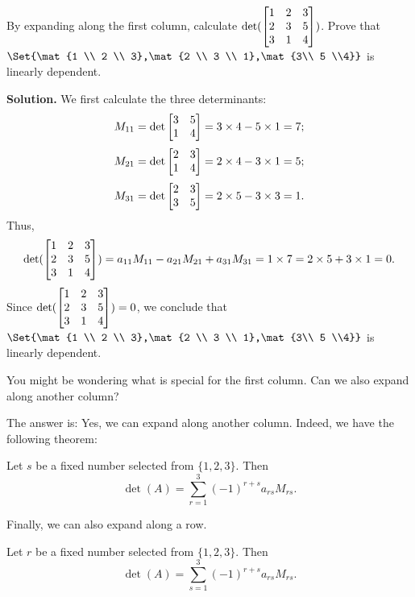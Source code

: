 \begin{example}
By expanding along the first column, calculate \(\det(\mat{1 & 2 & 3 \\ 2 & 3 & 5 \\ 3 & 1 & 4})\). Prove that \(\Set{\mat{1 \\ 2 \\ 3},\mat{2 \\ 3 \\ 1},\mat{3\\ 5 \\4}}\) is linearly dependent.
\end{example}
\textbf{Solution. }
We first calculate the three determinants:
\[M_{11}=\det\mat{3 & 5 \\ 1 & 4}=3\times 4 - 5\times 1=7;\]
\[M_{21}=\det\mat{2 & 3 \\ 1 & 4}=2\times 4 - 3\times 1=5;\]
\[M_{31}=\det\mat{2 & 3 \\ 3 & 5}=2\times 5 - 3\times 3=1.\]
Thus, \[\det(\mat{1 & 2 & 3 \\ 2 & 3 & 5 \\ 3 & 1 & 4})=a_{11}M_{11}-a_{21}M_{21}+a_{31}M_{31}=1\times 7=2\times 5+3\times 1=0.\]
Since \(\det(\mat{1 & 2 & 3 \\ 2 & 3 & 5 \\ 3 & 1 & 4})=0\), we conclude that \(\Set{\mat{1 \\ 2 \\ 3},\mat{2 \\ 3 \\ 1},\mat{3\\ 5 \\4}}\) is linearly dependent.

You might be wondering what is special for the first column. Can we also expand along another column?

The answer is: Yes, we can expand along another column. Indeed, we have the following theorem:
\begin{theorem}
  Let \(s\) be a fixed number selected from \(\{1,2,3\}\). Then \[\det(A)=\sum_{r=1}^{3}(-1)^{r+s}a_{rs}M_{rs}.\]
\end{theorem}

Finally, we can also expand along a row.
\begin{theorem}
  Let \(r\) be a fixed number selected from \(\{1,2,3\}\). Then \[\det(A)=\sum_{s=1}^{3}(-1)^{r+s}a_{rs}M_{rs}.\]
\end{theorem}

